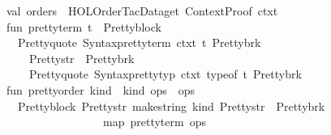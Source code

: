 \begin{isabellebody}
\ \ \ \ val\ orders\ {\isacharequal}{\kern0pt}\ HOL{\isacharunderscore}{\kern0pt}Order{\isacharunderscore}{\kern0pt}Tac{\isachardot}{\kern0pt}Data{\isachardot}{\kern0pt}get\ {\isacharparenleft}{\kern0pt}Context{\isachardot}{\kern0pt}Proof\ ctxt{\isacharparenright}{\kern0pt}\isanewline
\ \ \ \ fun\ pretty{\isacharunderscore}{\kern0pt}term\ t\ {\isacharequal}{\kern0pt}\ Pretty{\isachardot}{\kern0pt}block\isanewline
\ \ \ \ \ \ {\isacharbrackleft}{\kern0pt}Pretty{\isachardot}{\kern0pt}quote\ {\isacharparenleft}{\kern0pt}Syntax{\isachardot}{\kern0pt}pretty{\isacharunderscore}{\kern0pt}term\ ctxt\ t{\isacharparenright}{\kern0pt}{\isacharcomma}{\kern0pt}\ Pretty{\isachardot}{\kern0pt}brk\ {}{\isacharcomma}{\kern0pt}\isanewline
\ \ \ \ \ \ \ \ Pretty{\isachardot}{\kern0pt}str\ {\isachardoublequote}{\kern0pt}{\isacharcolon}{\kern0pt}{\isacharcolon}{\kern0pt}{\isachardoublequote}{\kern0pt}{\isacharcomma}{\kern0pt}\ Pretty{\isachardot}{\kern0pt}brk\ {}{\isacharcomma}{\kern0pt}\isanewline
\ \ \ \ \ \ \ \ Pretty{\isachardot}{\kern0pt}quote\ {\isacharparenleft}{\kern0pt}Syntax{\isachardot}{\kern0pt}pretty{\isacharunderscore}{\kern0pt}typ\ ctxt\ {\isacharparenleft}{\kern0pt}type{\isacharunderscore}{\kern0pt}of\ t{\isacharparenright}{\kern0pt}{\isacharparenright}{\kern0pt}{\isacharcomma}{\kern0pt}\ Pretty{\isachardot}{\kern0pt}brk\ {}{\isacharbrackright}{\kern0pt}\isanewline
\ \ \ \ fun\ pretty{\isacharunderscore}{\kern0pt}order\ {\isacharparenleft}{\kern0pt}{\isacharbraceleft}{\kern0pt}kind\ {\isacharequal}{\kern0pt}\ kind{\isacharcomma}{\kern0pt}\ ops\ {\isacharequal}{\kern0pt}\ ops{\isacharcomma}{\kern0pt}\ {\isachardot}{\kern0pt}{\isachardot}{\kern0pt}{\isachardot}{\kern0pt}{\isacharbraceright}{\kern0pt}{\isacharcomma}{\kern0pt}\ {\isacharunderscore}{\kern0pt}{\isacharparenright}{\kern0pt}\ {\isacharequal}{\kern0pt}\isanewline
\ \ \ \ \ \ Pretty{\isachardot}{\kern0pt}block\ {\isacharparenleft}{\kern0pt}{\isacharbrackleft}{\kern0pt}Pretty{\isachardot}{\kern0pt}str\ {\isacharparenleft}{\kern0pt}{\isacharat}{\kern0pt}{\isacharbraceleft}{\kern0pt}make{\isacharunderscore}{\kern0pt}string{\isacharbraceright}{\kern0pt}\ kind{\isacharparenright}{\kern0pt}{\isacharcomma}{\kern0pt}\ Pretty{\isachardot}{\kern0pt}str\ {\isachardoublequote}{\kern0pt}{\isacharcolon}{\kern0pt}{\isachardoublequote}{\kern0pt}{\isacharcomma}{\kern0pt}\ Pretty{\isachardot}{\kern0pt}brk\ {}{\isacharbrackright}{\kern0pt}\isanewline
\ \ \ \ \ \ \ \ \ \ \ \ \ \ \ \ \ \ \ \ {\isacharat}{\kern0pt}\ map\ pretty{\isacharunderscore}{\kern0pt}term\ ops{\isacharparenright}{\kern0pt}\isanewline

\end{isabellebody}
